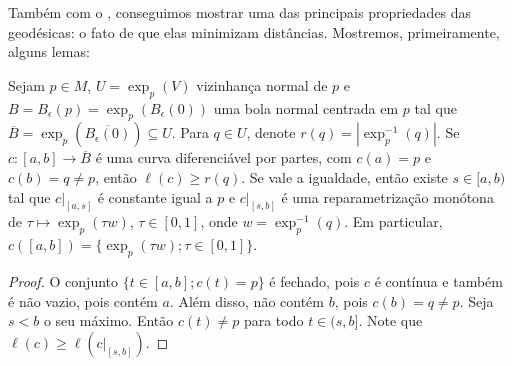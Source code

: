 Também com o , conseguimos mostrar uma das principais propriedades das geodésicas: o fato de que elas minimizam distâncias. Mostremos, primeiramente, alguns lemas:
\begin{lemma}
    \label{lem:desigualdade-radial}
    Sejam $p \in M$, $U=\exp_{p}(V)$ vizinhança normal de $p$ e $B=B_{\epsilon}(p)=\exp_{p}(B_{\epsilon}(0))$ uma bola normal centrada em $p$ tal que $\overline{B}=\exp_{p}(\overline{B_{\epsilon}(0)})\subseteq U$. Para $q\in U$, denote $r(q)=|\exp_{p}^{-1}(q)|$.
    Se $c:[a,b]\to \overline{B}$ é uma curva diferenciável por partes, com $c(a)=p$ e $c(b)=q\neq p$, então $\ell(c)\geq r(q)$.
    Se vale a igualdade, então existe $s\in[a,b)$ tal que $c|_{[a,s]}$ é constante igual a $p$ e $c|_{[s,b]}$ é uma reparametrização monótona de $\tau\mapsto\exp_{p}(\tau w)$, $\tau\in[0,1]$, onde $w=\exp_{p}^{-1}(q)$. Em particular, $c([a,b])=\{ \exp_{p}(\tau w); \tau\in[0,1] \}$.
    \begin{proof}

        O conjunto $\{ t\in[a,b]; c(t)=p \}$ é fechado, pois $c$ é contínua e também é não vazio, pois contém $a$. Além disso, não contém $b$, pois $c(b)=q\neq p$. Seja $s<b$ o seu máximo. Então $c(t)\neq p$ para todo $t\in(s,b]$. Note que $\ell(c)\geq \ell(c|_{[s,b]})$.


\end{proof}
\end{lemma}
